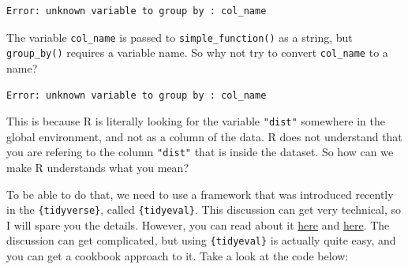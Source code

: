 \documentclass[]{gitbook}
\newenvironment{Shaded}{\begin{snugshade}}{\end{snugshade}}
\newcommand{\ControlFlowTok}[1]{\textcolor[rgb]{0.13,0.29,0.53}{\textbf{#1}}}
\newcommand{\DataTypeTok}[1]{\textcolor[rgb]{0.13,0.29,0.53}{#1}}
\newcommand{\KeywordTok}[1]{\textcolor[rgb]{0.13,0.29,0.53}{\textbf{#1}}}
\newcommand{\NormalTok}[1]{#1}
\newcommand{\OperatorTok}[1]{\textcolor[rgb]{0.81,0.36,0.00}{\textbf{#1}}}
\newcommand{\StringTok}[1]{\textcolor[rgb]{0.31,0.60,0.02}{#1}}
\begin{document}
\begin{verbatim}
Error: unknown variable to group by : col_name
\end{verbatim}

The variable \texttt{col\_name} is passed to \texttt{simple\_function()} as a string, but \texttt{group\_by()} requires a
variable name. So why not try to convert \texttt{col\_name} to a name?

\begin{Shaded}
\end{Shaded}

\begin{verbatim}
Error: unknown variable to group by : col_name
\end{verbatim}

This is because R is literally looking for the variable \texttt{"dist"} somewhere in the global
environment, and not as a column of the data. R does not understand that you are refering to the
column \texttt{"dist"} that is inside the dataset. So how can we make R understands what you mean?

To be able to do that, we need to use a framework that was introduced recently in the \texttt{\{tidyverse\}},
called \texttt{\{tidyeval\}}. This discussion can get very technical, so I will spare you the details.
However, you can read about it \href{http://dplyr.tidyverse.org/articles/programming.html}{here} and
\href{https://cran.r-project.org/web/packages/rlang/vignettes/tidy-evaluation.html}{here}. The
discussion can get complicated, but using \texttt{\{tidyeval\}} is actually quite easy, and you can get a
cookbook approach to it. Take a look at the code below:

\begin{Shaded}
\end{Shaded}
\end{document}
